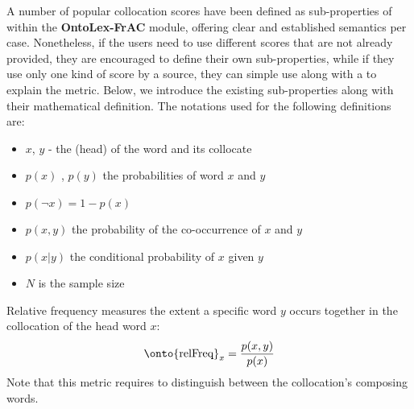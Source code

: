 \label{sec:scores}

A number of popular collocation scores have been defined as sub-properties of 
within the \textbf{OntoLex-FrAC} module, offering clear and established semantics per case. Nonetheless, 
if the users need to use different scores that are not already provided, they are encouraged to 
define their own sub-properties, while if they use only one kind of score by a source, they can 
simple use  along with a  to explain the metric. Below, we
introduce the existing  sub-properties along with their mathematical 
definition. The notations used for the following definitions are:
\begin{itemize}
    \item $x$, $y$ - the (head) of the word and its collocate
    \item $p(x)$ , $p(y)$ the probabilities of word $x$ and $y$
    \item $p(\neg x) = 1 - p(x)$
    \item $p(x,y)$ the probability of the co-occurrence of $x$ and $y$
    \item $p(x|y)$ the conditional probability of $x$ given $y$
    \item $N$ is the sample size
\end{itemize}



\begin{definition}
Relative frequency measures the extent a specific word $y$ occurs together in 
the collocation of the head word $x$:
\[\text{\onto{relFreq}}_x = \frac{p(x,y)}{p(x)}\] %
Note that this metric requires  to distinguish between the collocation's 
composing words.
\end{definition}

